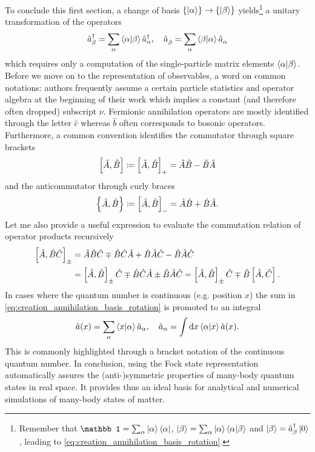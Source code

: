 To conclude this first section, a change of basis $\{\ket\alpha\}\rightarrow\{\ket\beta\}$ yields\footnote{Remember that $\mathbb1 = \sum_\alpha\ket{\alpha}\bra{\alpha}$, $\ket{\beta} = \sum_\alpha\ket{\alpha}\braket{\alpha|\beta}$ and $\ket{\beta}=\hat a^\dag_\beta\ket{0}$, leading to \cref{eq:creation_annihilation_basis_rotation}.} a unitary transformation of the operators
\begin{align}
    \hat a^\dag_\beta = \sum_\alpha \braket{\alpha|\beta}\hat a^\dag_\alpha,
    \quad
    \hat a^\pdag_\beta = \sum_\alpha \braket{\beta|\alpha}\hat a^\pdag_\alpha
    \label{eq:creation_annihilation_basis_rotation}
\end{align}
which requires only a computation of the single-particle matrix elements $\braket{\alpha|\beta}$.
Before we move on to the representation of observables, a word on common notations: authors frequently assume a certain particle statistics and operator algebra at the beginning of their work which implies a constant (and therefore often dropped) subscript $\nu$.
Fermionic annihilation operators are mostly identified through the letter $\hat c$ whereas $\hat b$ often corresponds to bosonic operators.
Furthermore, a common convention identifies the commutator through square brackets
\begin{align}
    \left[\hat A,\hat B\right]\coloneqq\left[ \hat A,\hat B \right]_+ = \hat A\hat B - \hat B\hat A
\end{align}
and the anticommutator through curly braces
\begin{align}
    \left\{ \hat A,\hat B \right\}\coloneqq\left[ \hat A,\hat B \right]_- = \hat A\hat B + \hat B\hat A.
\end{align}
Let me also provide a useful expression to evaluate the commutation relation of operator products recursively
\begin{align}
    \left[ \hat A, \hat B \hat C \right]_\pm
    &= \hat A\hat B\hat C \mp \hat B\hat C\hat A + \hat B\hat A\hat C - \hat B\hat A\hat C
    \\
    &= \left[ \hat A, \hat B \right]_\pm\hat C \mp \hat B\hat C\hat A \pm \hat B\hat A\hat C
    = \left[ \hat A, \hat B \right]_\pm\hat C \mp \hat B\left[ \hat A,\hat C \right].
    \label{eq:recursive_commutation}
\end{align}
In cases where the quantum number is continuous (e.g. position $x$) the sum in \cref{eq:creation_annihilation_basis_rotation} is promoted to an integral
\begin{align}
    \hat a(x) = \sum_\alpha \braket{x | \alpha} \hat a_\alpha,
    \quad
    \hat a_\alpha = \int{\mathrm dx} \braket{\alpha | x} \hat a(x).
\end{align}
This is commonly highlighted through a bracket notation of the continuous quantum number.
In conclusion, using the Fock state representation automatically assures the (anti-)symmetric properties of many-body quantum states in real space.
It provides thus an ideal basis for analytical and numerical simulations of many-body states of matter.

